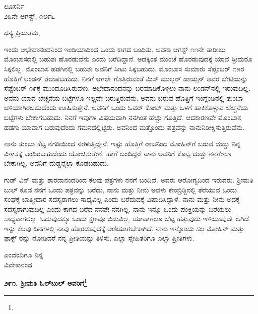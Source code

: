 \vspace{-0.5cm}

\begin{flushright}
ಲೂಸರ್ನಿ\\೨೩ನೇ ಆಗಸ್ಟ್, ೧೮೯೬
\end{flushright}

\vspace{-0.45cm}

\noindent
ಧನ್ಯ ಪ್ರಿಯತಮ,

ಇಂದು ಅಭೇದಾನಂದನಿಂದ ಇಂಡಿಯಾದಿಂದ ಒಂದು ಕಾಗದ ಬಂದಿತು. ಅವನು ಆಗಸ್ಟ್ ೧೧ನೇ ತಾರೀಖು  ಮೊಂಬಾಸದಲ್ಲಿ ಬಹುಶಃ ಹೊರಡುವೆನು ಎಂದು ಬರೆದಿದ್ದಾನೆ. ಅದಕ್ಕಿಂತ ಮುಂಚೆ ಹೊರಡುವುದಕ್ಕೆ ಯಾವ ಸ್ಟೀಮರೂ ಸಿಕ್ಕಲಿಲ್ಲ. ಮೊಂಬಾಸ ಹಡಗಿನಲ್ಲಿ ಬಹುಶಃ ಅವನಿಗೆ ಸೀಟು ಸಿಕ್ಕಬಹುದು. ಮೊಂಬಾಸ ಸುಮಾರು ಸೆಪ್ಟೆಂಬರ್ ೧೫ರ ಹೊತ್ತಿಗೆ ಲಂಡನ್ ತಲುಪಬಹುದು. ನಿನಗೆ ಆಗಲೇ ಗೊತ್ತಿರುವಂತೆ ಮಿಸ್ ಮುಲ್ಲರ್ ಡಾಯ್ಸನ್ ಅವರ ಭೇಟಿಯನ್ನು ಸೆಪ್ಟೆಂಬರ್ ೧೯ಕ್ಕೆ ಮುಂದೂಡಿಸಿರುವಳು. ಅಭೇದಾನಂದನನ್ನು ಬರಮಾಡಿಕೊಳ್ಳಲು ನಾನು ಲಂಡನ್‌ನಲ್ಲಿ ಇರುವುದಿಲ್ಲ. ಅವನು ಯಾವ ಬೆಚ್ಚನೆಯ ಬಟ್ಟೆಗಳೂ ಇಲ್ಲದೇ ಬರುತ್ತಿರುವನು. ಅವನು ಬರುವ ಹೊತ್ತಿಗೆ ಇಂಗ್ಲೆಂಡಿನಲ್ಲಿ ತುಂಬಾ ಚಳಿಯಾಗಿರಬಹುದೆಂದು ಊಹಿಸುತ್ತೇನೆ. ಅವನಿಗೆ ಒಂದು ಓವರ್ ಕೋಟ್ ಮತ್ತು ಒಳಗೆ ಹಾಕಿಕೊಳ್ಳುವ ಬೆಚ್ಚನೆಯ ಬಟ್ಟೆಗಳು ಬೇಕಾಗಬಹುದು. ನಿನಗೆ ಇವುಗಳ ವಿಷಯವಾಗಿ ನನಗಿಂತ ಹೆಚ್ಚು ಗೊತ್ತಿದೆ. ಆದಕಾರಣವೇ ಮೊಂಬಾಸ ಹಡಗು ಯಾವಾಗ ಬರುವುದೆಂದು ಗಮನದಲ್ಲಿಟ್ಟಿರು. ಅವನಿಂದ ಮತ್ತೊಂದು ಪತ್ರವನ್ನು ನಾನುನಿರೀಕ್ಷಿಸುತ್ತಿರುವೆನು.

ನಾನು ತುಂಬಾ ಕೆಟ್ಟ ನೆಗಡಿಯಿಂದ ನರಳುತ್ತಿದ್ದೇನೆ. ಇಷ್ಟು ಹೊತ್ತಿಗೆ ರಾಜನಿಂದ ಮೋಹಿನ್‌ಗೆ ಬರುವ ದುಡ್ಡು ನಿನ್ನ ವಿಳಾಸಕ್ಕೆ ಬಂದಿರಬಹುದೆಂದು ಯೋಚಿಸುತ್ತೇನೆ. ಹಾಗೆ ಬಂದಿದ್ದರೆ ನಾನು ಅವನಿಗೆ ಕೊಟ್ಟ ದುಡ್ಡು ನನಗೇನೂ ಬೇಕಾಗಿಲ್ಲ. ಅವನಿಗೆ ದುಡ್ಡನ್ನೆಲ್ಲಾ ಕೊಡಬಹುದು.

ಗುಡ್ ವಿನ್ ಮತ್ತು ಶಾರದಾನಂದರಿಂದ ಕೆಲವು ಪತ್ರಗಳು ನನಗೆ ಬಂದಿವೆ. ಅವರು ಆರೋಗ್ಯದಿಂದ ಇರುವರು. ಶ‍್ರೀಮತಿ ಬುಲ್ ಕೂಡ ನನಗೆ ಒಂದು ಪತ್ರವನ್ನು ಬರೆದು, ನಾನು ಮತ್ತು ನೀನು ಅವಳು ಕೇಂಬ್ರಿಡ್ಜಿನಲ್ಲಿ ತೆರೆಯುವ ಒಂದು ಸಂಘಕ್ಕೆ ಬಾತ್ಮೀದಾರ ಸದಸ್ಯರಾಗಲು ಸಾಧ್ಯವಿಲ್ಲ ಎಂದು ಬರೆದುದಕ್ಕೆ ವಿಷಾದಿಸಿದ್ದಾಳೆ. ನಾನು ಮತ್ತು ನೀನು ಅದಕ್ಕೆ ಸದಸ್ಯರಾಗುವುದಿಲ್ಲ ಎಂದು ಕಾಗದ ಬರೆದ ನೆನಪೇ ನನಗಿಲ್ಲ. ನಾನು ಇನ್ನೂ ಒಂದು ಪಂಕ್ತಿಯನ್ನು ಬರೆಯಲು ಸಾಧ್ಯವಾಗಲಿಲ್ಲ. ಓದುವುದಕ್ಕೂ ಒಂದು ಕ್ಷಣವೂ ಬಿಡುವಿಲ್ಲ. ಯಾವಾಗಲೂ ಬೆಟ್ಟ ಹತ್ತುವುದು ಇಳಿಯುವುದೇ ಆಗಿದೆ. ಇನ್ನು ಕೆಲವು ದಿನಗಳಲ್ಲಿ ನಾವು ಹೊರಡುವುದಕ್ಕೆ ಅಣಿಯಾಗಬೇಕಾಗಿದೆ. ನೀನು ಇನ್ನೊಂದು ಸಲ ಮೋಹಿನ್ ಮತ್ತು ಫಾಕ್ಸ್ ರನ್ನು ನೋಡಿದರೆ ನನ್ನ ಪ್ರೀತಿಯನ್ನು ತಿಳಿಸು. ಎಲ್ಲಾ ಸ್ನೇಹಿತರಿಗೂ ಎಲ್ಲಾ ಪ್ರೀತಿಗಳು.

\vspace{-0.4cm}

{\flushright
ಎಂದೆಂದಿಗೂ ನಿನ್ನ\\ವಿವೇಕಾನಂದ\par}

\begin{center}
\textbf{೨೯೧. ಶ‍್ರೀಮತಿ ಓಲ್‌ಬುಲ್‌ ಅವರಿಗೆ}\footnote{}
\end{center}

